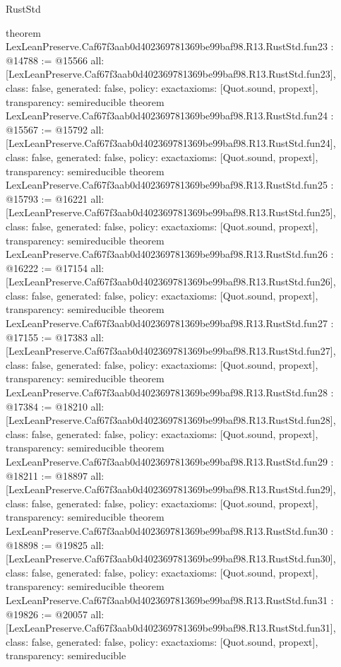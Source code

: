 \begin{lexlean}{RustStd}
\begin{coremodule}
{}
theorem LexLeanPreserve.Caf67f3aab0d402369781369be99baf98.R13.RustStd.fun23 : @14788 := @15566 {
  all: [LexLeanPreserve.Caf67f3aab0d402369781369be99baf98.R13.RustStd.fun23],
  class: false,
  generated: false,
  policy: exact{axioms: [Quot.sound, propext]},
  transparency: semireducible
}
theorem LexLeanPreserve.Caf67f3aab0d402369781369be99baf98.R13.RustStd.fun24 : @15567 := @15792 {
  all: [LexLeanPreserve.Caf67f3aab0d402369781369be99baf98.R13.RustStd.fun24],
  class: false,
  generated: false,
  policy: exact{axioms: [Quot.sound, propext]},
  transparency: semireducible
}
theorem LexLeanPreserve.Caf67f3aab0d402369781369be99baf98.R13.RustStd.fun25 : @15793 := @16221 {
  all: [LexLeanPreserve.Caf67f3aab0d402369781369be99baf98.R13.RustStd.fun25],
  class: false,
  generated: false,
  policy: exact{axioms: [Quot.sound, propext]},
  transparency: semireducible
}
theorem LexLeanPreserve.Caf67f3aab0d402369781369be99baf98.R13.RustStd.fun26 : @16222 := @17154 {
  all: [LexLeanPreserve.Caf67f3aab0d402369781369be99baf98.R13.RustStd.fun26],
  class: false,
  generated: false,
  policy: exact{axioms: [Quot.sound, propext]},
  transparency: semireducible
}
theorem LexLeanPreserve.Caf67f3aab0d402369781369be99baf98.R13.RustStd.fun27 : @17155 := @17383 {
  all: [LexLeanPreserve.Caf67f3aab0d402369781369be99baf98.R13.RustStd.fun27],
  class: false,
  generated: false,
  policy: exact{axioms: [Quot.sound, propext]},
  transparency: semireducible
}
theorem LexLeanPreserve.Caf67f3aab0d402369781369be99baf98.R13.RustStd.fun28 : @17384 := @18210 {
  all: [LexLeanPreserve.Caf67f3aab0d402369781369be99baf98.R13.RustStd.fun28],
  class: false,
  generated: false,
  policy: exact{axioms: [Quot.sound, propext]},
  transparency: semireducible
}
theorem LexLeanPreserve.Caf67f3aab0d402369781369be99baf98.R13.RustStd.fun29 : @18211 := @18897 {
  all: [LexLeanPreserve.Caf67f3aab0d402369781369be99baf98.R13.RustStd.fun29],
  class: false,
  generated: false,
  policy: exact{axioms: [Quot.sound, propext]},
  transparency: semireducible
}
theorem LexLeanPreserve.Caf67f3aab0d402369781369be99baf98.R13.RustStd.fun30 : @18898 := @19825 {
  all: [LexLeanPreserve.Caf67f3aab0d402369781369be99baf98.R13.RustStd.fun30],
  class: false,
  generated: false,
  policy: exact{axioms: [Quot.sound, propext]},
  transparency: semireducible
}
theorem LexLeanPreserve.Caf67f3aab0d402369781369be99baf98.R13.RustStd.fun31 : @19826 := @20057 {
  all: [LexLeanPreserve.Caf67f3aab0d402369781369be99baf98.R13.RustStd.fun31],
  class: false,
  generated: false,
  policy: exact{axioms: [Quot.sound, propext]},
  transparency: semireducible
}
\end{coremodule}
\end{lexlean}
